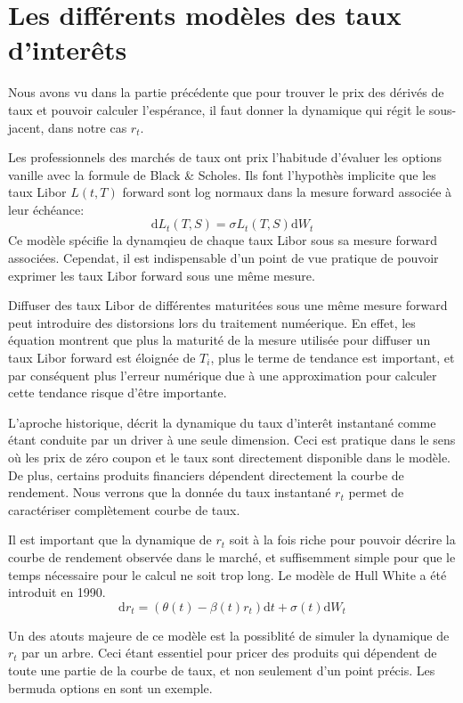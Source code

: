 
\chapter{Les différents modèles des taux d'interêts}

Nous avons vu dans la partie précédente que pour trouver le prix des dérivés de taux et pouvoir calculer l'espérance, il faut donner la dynamique qui régit le sous-jacent, dans notre cas  $r_t$.

Les professionnels des marchés de taux ont prix l'habitude d'évaluer les options vanille avec la formule de Black \& Scholes. Ils font l'hypothès implicite que les taux Libor $L(t, T)$ forward sont log normaux dans la mesure forward associée à leur échéance:
$$\mathrm{d} L_t(T, S) = \sigma L_t(T, S) \mathrm{d}W_t$$
Ce modèle spécifie la dynamqieu de chaque taux Libor sous sa mesure forward associées. Cependat, il est indispensable d'un point de vue pratique de pouvoir exprimer les taux Libor forward sous une même mesure. 

Diffuser des taux Libor de différentes maturitées sous une même mesure forward peut introduire des distorsions lors du traitement numéerique. En effet, les  équation montrent que plus la maturité de la mesure utilisée pour diffuser un taux Libor forward est  éloignée de $T_i$, plus le terme de tendance est important, et par conséquent plus l’erreur numérique due à une approximation pour calculer cette tendance risque d’être importante.

L'aproche historique, décrit la dynamique du taux d'interêt instantané comme étant conduite par un driver à une seule dimension. Ceci est pratique dans le sens où les prix de zéro coupon et le taux sont directement disponible dans le modèle.
De plus, certains produits financiers dépendent directement la courbe de rendement.
Nous verrons que la donnée du taux instantané $r_t$ permet de caractériser complètement courbe de taux.

Il est important que la dynamique de $r_t$ soit à la fois riche pour pouvoir décrire la courbe de rendement observée dans le marché, et suffisemment simple pour que le temps nécessaire pour le calcul ne soit trop long. Le modèle de Hull White a été introduit en 1990.
$$ \mathrm{d}r_t =  (\theta(t) - \beta(t) r_t) \mathrm{d}t + \sigma(t) \mathrm{d} W_t$$

Un des atouts majeure de ce modèle est la possiblité de simuler la dynamique de $r_t$ par un arbre. Ceci étant essentiel pour pricer des produits qui dépendent de toute une partie de la courbe de taux, et non seulement d'un point précis. Les bermuda options en sont un exemple.

